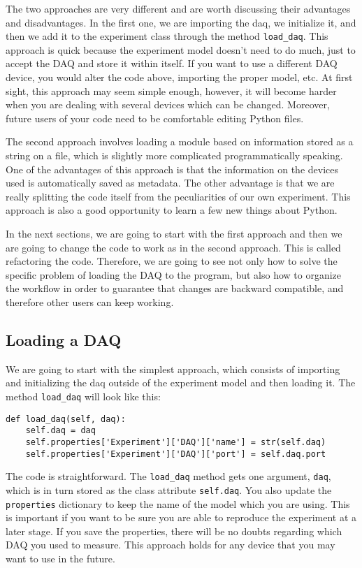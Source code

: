 The two approaches are very different and are worth discussing their advantages and disadvantages. In the first one, we are
importing the daq, we initialize it, and then we add it to the experiment class through the method \texttt{load\_daq}. This approach is quick because the experiment model doesn't need to do much, just to accept the DAQ and store it within itself. If you want to use a different DAQ device, you would alter the code above, importing the proper model, etc. At first sight, this approach may seem simple enough, however, it will become harder when you are dealing with several devices which can be changed. Moreover, future users of your code need to be comfortable editing Python files. 

The second approach involves loading a module based on information stored as a string on a file, which is slightly more complicated programmatically speaking. One of the advantages of this approach is that the information on the devices used is automatically saved as metadata. The other advantage is that we are really splitting the code itself from the peculiarities of our own experiment. This approach is also a good opportunity to learn a few new things about Python. 

In the next sections, we are going to start with the first approach and then we are going to change the code to work as in the second approach. This is called refactoring the code. Therefore, we are going to see not only how to solve the specific problem of loading the DAQ to the program, but also how to organize the workflow in order to guarantee that changes are backward compatible, and therefore other users can keep working. 

\subsection{Loading a DAQ}\label{loading-a-daq}
We are going to start with the simplest approach, which consists of importing and initializing the daq outside of the experiment model and then loading it. The method \texttt{load_daq} will look like this:

\begin{verbatim}
def load_daq(self, daq):
    self.daq = daq
    self.properties['Experiment']['DAQ']['name'] = str(self.daq)
    self.properties['Experiment']['DAQ']['port'] = self.daq.port
\end{verbatim}

The code is straightforward. The \texttt{load_daq} method gets one
argument, \texttt{daq}, which is in turn stored as the class attribute \texttt{self.daq}.
You also update the \texttt{properties} dictionary to keep the name of
the model which you are using. This is important if you want to be sure you are able to reproduce the experiment at a later stage. If you save the properties, there will be no doubts regarding which DAQ you used to measure. This approach holds for any device that you may want to use in the future. 

